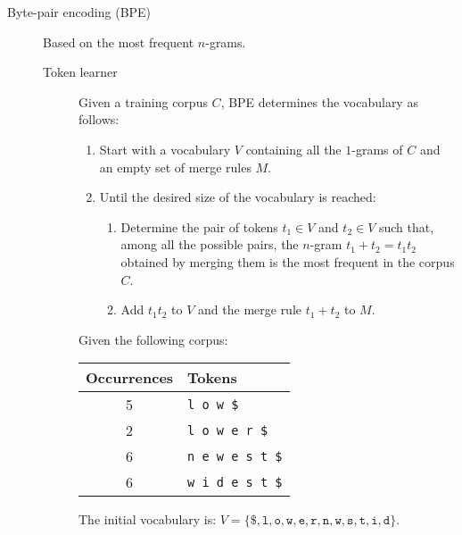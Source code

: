 \begin{description}
    \item[Byte-pair encoding (BPE)] 
        Based on the most frequent $n$-grams.

        \begin{description}
            \item[Token learner]
                Given a training corpus $C$, BPE determines the vocabulary as follows:
                \begin{enumerate}
                    \item Start with a vocabulary $V$ containing all the $1$-grams of $C$ and an empty set of merge rules $M$.
                    \item Until the desired size of the vocabulary is reached:
                    \begin{enumerate}
                        \item Determine the pair of tokens $t_1 \in V$ and $t_2 \in V$ such that, among all the possible pairs, the $n$-gram $t_1 + t_2 = t_1t_2$ obtained by merging them is the most frequent in the corpus $C$.
                        \item Add $t_1t_2$ to $V$ and the merge rule $t_1+t_2$ to $M$.
                    \end{enumerate}
                \end{enumerate}

                \begin{example}
                    Given the following corpus:
                    \begin{table}[H]
                        \centering
                        \footnotesize
                        \begin{tabular}{cl}
                            \toprule
                            \textbf{Occurrences} & \textbf{Tokens} \\
                            \midrule
                            5 & \texttt{l o w \$} \\
                            2 & \texttt{l o w e r \$} \\
                            6 & \texttt{n e w e s t \$} \\
                            6 & \texttt{w i d e s t \$} \\
                            \bottomrule
                        \end{tabular}
                    \end{table}
                    The initial vocabulary is: $V = \{  \texttt{\$}, \texttt{l}, \texttt{o}, \texttt{w}, \texttt{e}, \texttt{r}, \texttt{n}, \texttt{w}, \texttt{s}, \texttt{t}, \texttt{i}, \texttt{d} \}$.


\end{example}
\end{description}
\end{description}
